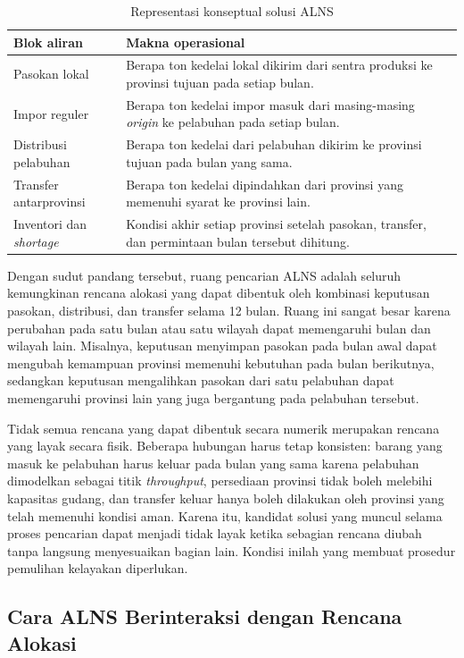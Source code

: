 \documentclass{file/TA-ITS}
\theoremstyle{definition}
\theoremstyle{definition}
\theoremstyle{plain}
\begin{document}
\begin{table}[H]
\centering
\caption{Representasi konseptual solusi ALNS}
\label{tab:representasi_bab3}
\small
\begin{tabularx}{\textwidth}{@{}p{}X@{}}
\toprule
\textbf{Blok aliran} & \textbf{Makna operasional} \\
\midrule
Pasokan lokal & Berapa ton kedelai lokal dikirim dari sentra produksi ke provinsi tujuan pada setiap bulan. \\
Impor reguler & Berapa ton kedelai impor masuk dari masing-masing \textit{origin} ke pelabuhan pada setiap bulan. \\
Distribusi pelabuhan & Berapa ton kedelai dari pelabuhan dikirim ke provinsi tujuan pada bulan yang sama. \\
Transfer antarprovinsi & Berapa ton kedelai dipindahkan dari provinsi yang memenuhi syarat ke provinsi lain. \\
Inventori dan \textit{shortage} & Kondisi akhir setiap provinsi setelah pasokan, transfer, dan permintaan bulan tersebut dihitung. \\
\bottomrule
\end{tabularx}
\end{table}
Dengan sudut pandang tersebut, ruang pencarian ALNS adalah seluruh kemungkinan rencana alokasi yang dapat dibentuk oleh kombinasi keputusan pasokan, distribusi, dan transfer selama 12 bulan. Ruang ini sangat besar karena perubahan pada satu bulan atau satu wilayah dapat memengaruhi bulan dan wilayah lain. Misalnya, keputusan menyimpan pasokan pada bulan awal dapat mengubah kemampuan provinsi memenuhi kebutuhan pada bulan berikutnya, sedangkan keputusan mengalihkan pasokan dari satu pelabuhan dapat memengaruhi provinsi lain yang juga bergantung pada pelabuhan tersebut.

Tidak semua rencana yang dapat dibentuk secara numerik merupakan rencana yang layak secara fisik. Beberapa hubungan harus tetap konsisten: barang yang masuk ke pelabuhan harus keluar pada bulan yang sama karena pelabuhan dimodelkan sebagai titik \textit{throughput}, persediaan provinsi tidak boleh melebihi kapasitas gudang, dan transfer keluar hanya boleh dilakukan oleh provinsi yang telah memenuhi kondisi aman. Karena itu, kandidat solusi yang muncul selama proses pencarian dapat menjadi tidak layak ketika sebagian rencana diubah tanpa langsung menyesuaikan bagian lain. Kondisi inilah yang membuat prosedur pemulihan kelayakan diperlukan.

\subsection{Cara ALNS Berinteraksi dengan Rencana Alokasi}
\end{document}
